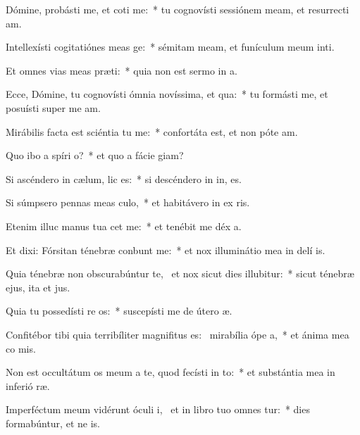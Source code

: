 \item Dómine, probásti me, et coti me:~* tu cognovísti sessiónem meam, et resurrecti am.
\item Intellexísti cogitatiónes meas  ge:~* sémitam meam, et funículum meum inti.
\item Et omnes vias meas præti:~* quia non est sermo in  a.
\item Ecce, Dómine, tu cognovísti ómnia novíssima, et qua:~* tu formásti me, et posuísti super me  am.
\item Mirábilis facta est sciéntia tu  me:~* confortáta est, et non póte  am.
\item Quo ibo a spíri o?~* et quo a fácie  giam?
\item Si ascéndero in cælum,  lic es:~* si descéndero in in, es.
\item Si súmpsero pennas meas culo,~* et habitávero in ex ris.
\item Etenim illuc manus tua cet me:~* et tenébit me déx a.
\item Et dixi: Fórsitan ténebræ conbunt me:~* et nox illuminátio mea in delí is.
\item Quia ténebræ non obscurabúntur  te,~\pscross{} et nox sicut dies illubitur:~* sicut ténebræ ejus, ita et  jus.
\item Quia tu possedísti re os:~* suscepísti me de útero  æ.
\item Confitébor tibi quia terribíliter magnifitus es:~\pscross{} mirabília ópe a,~* et ánima mea co mis.
\item Non est occultátum os meum a te, quod fecísti in to:~* et substántia mea in inferió ræ.
\item Imperféctum meum vidérunt óculi i,~\pscross{} et in libro tuo omnes tur:~* dies formabúntur, et ne  is.
